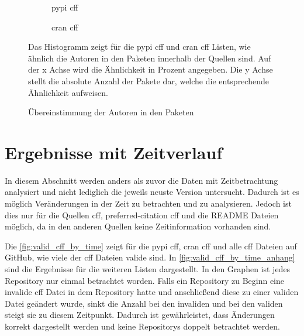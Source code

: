\begin{figure}
    \begin{subfigure}{.5\textwidth}
        \centering
        
        \caption{\gls{pypi} \gls{cff}}
        \label{fig:similarity_pypi_cff}
    \end{subfigure}%
    \begin{subfigure}{.5\textwidth}
        \centering
        
        \caption{\gls{cran} \gls{cff}}
        \label{fig:similarity_cran_cff}
    \end{subfigure}
    \caption{Übereinstimmung der Autoren in den Paketen}
    \label{fig:similarities}
    \small
    \raggedright
    Das Histogramm zeigt für die \gls{pypi} \gls{cff} und \gls{cran} \gls{cff} Listen, wie ähnlich die Autoren in den Paketen innerhalb der Quellen sind. Auf der x Achse wird die Ähnlichkeit in Prozent angegeben. Die y Achse stellt die absolute Anzahl der Pakete dar, welche die entsprechende Ähnlichkeit aufweisen.
\end{figure}

\section{Ergebnisse mit Zeitverlauf}
\label{sec:gesamtheit_ergebnisse}
In diesem Abschnitt werden anders als zuvor die Daten mit Zeitbetrachtung analysiert und nicht lediglich die jeweils neuste Version untersucht.
Dadurch ist es möglich Veränderungen in der Zeit zu betrachten und zu analysieren.
Jedoch ist dies nur für die Quellen \gls{cff}, \glqq preferred-citation\grqq{} \gls{cff} und die README Dateien möglich, da in den anderen Quellen keine Zeitinformation vorhanden sind.

Die \autoref{fig:valid_cff_by_time} zeigt für die \gls{pypi} \gls{cff}, \gls{cran} \gls{cff} und alle \gls{cff} Dateien auf GitHub, wie viele der \gls{cff} Dateien valide sind.
In \autoref{fig:valid_cff_by_time_anhang} sind die Ergebnisse für die weiteren Listen dargestellt.
In den Graphen ist jedes Repository nur einmal betrachtet worden.
Falls ein Repository zu Beginn eine invalide \gls{cff} Datei in dem Repository hatte und anschließend diese zu einer validen Datei geändert wurde, sinkt die Anzahl bei den invaliden und bei den validen steigt sie zu diesem Zeitpunkt.
Dadurch ist gewährleistet, dass Änderungen korrekt dargestellt werden und keine Repositorys doppelt betrachtet werden.

